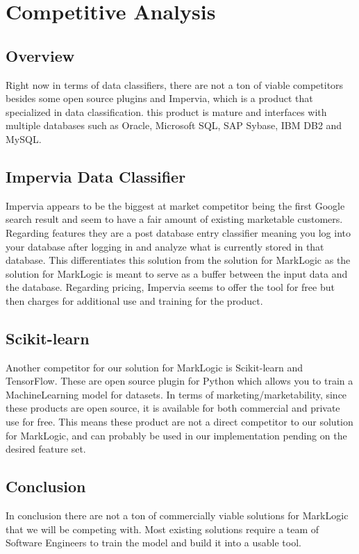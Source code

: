 \documentclass[12pt,oneside,letterpaper]{article}
\begin{document}
\section{Competitive Analysis}
\subsection{Overview}
Right now in terms of data classifiers, there are not a ton of viable competitors besides some open source plugins and Impervia, which is a product that specialized in data classification. this product is mature and interfaces with multiple databases such as Oracle, Microsoft SQL, SAP Sybase, IBM DB2 and MySQL.  \subsection{Impervia Data Classifier}
Impervia appears to be the biggest at market competitor being the first Google search result and seem to have a fair amount of existing marketable customers. Regarding features they are a post database entry classifier meaning you log into your database after logging in and analyze what is currently stored in that database. This differentiates this solution from the solution for MarkLogic as the solution for MarkLogic is meant to serve as a buffer between the input data and the database.  Regarding pricing, Impervia seems to offer the tool for free but then charges for additional use and training for the product. 


\subsection{Scikit-learn}
Another competitor for our solution for MarkLogic is Scikit-learn and TensorFlow. These are open source plugin for Python which allows you to train a MachineLearning model for datasets. In terms of marketing/marketability, since these products are open source, it is available for both commercial and private use for free. This means these product are not a direct competitor to our solution for MarkLogic, and can probably be used in our implementation pending on the desired feature set. 

\subsection{Conclusion}
In conclusion there are not a ton of commercially viable solutions for MarkLogic that we will be competing with. Most existing solutions require a team of Software Engineers to train the model and build it into a usable tool. 
\end{document}
